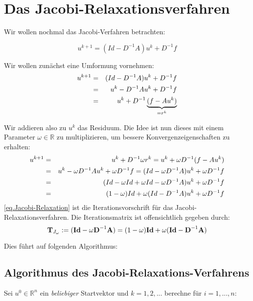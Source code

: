 \section{Das Jacobi-Relaxationsverfahren}\label{s.Jacobi Relaxation}

Wir wollen nochmal das Jacobi-Verfahren betrachten:

\begin{equation}
u^{k+1} = (Id - D^{-1}A)u^{k} + D^{-1}f
\end{equation}

Wir wollen zunächst eine Umformung vornehmen:
\begin{eqnarray}
u^{k+1} &=& (Id - D^{-1}A)u^{k} + D^{-1}f \notag \\
&=& u^{k} - D^{-1}Au^{k} + D^{-1}f \notag \\
&=& u^{k} + D^{-1} \underbrace{(f - Au^{k})}_{= r^{k}}
\end{eqnarray}

Wir addieren also zu $u^{k}$ das Residuum. Die Idee ist nun dieses mit einem Parameter $\omega \in \mathbb{R}$ zu multiplizieren, um bessere Konvergenzeigenschaften zu erhalten:
\begin{eqnarray}
u^{k+1} &=& u^{k} + D^{-1} \omega r^{k} = u^{k} + \omega D^{-1} (f - Au^{k}) \notag \\
&=& u^{k} - \omega D^{-1} Au^{k} + \omega D^{-1}f = (Id - \omega D^{-1} A)u^{k} + \omega D^{-1}f \notag \\
&=& (Id - \omega Id + \omega Id - \omega D^{-1} A)u^{k} + \omega D^{-1}f \notag \\
&=& (1 - \omega)Id + \omega(Id - D^{-1}A) u^{k} + \omega D^{-1}f\label{eq.Jacobi-Relaxation}
\end{eqnarray}
\autoref{eq.Jacobi-Relaxation} ist die Iterationsvorschrift für das Jacobi-Relaxationsverfahren. Die Iterationsmatrix ist offensichtlich gegeben durch:
\begin{equation}
{\textbf{T}}_{J_{\omega}} := ({\textbf{Id}} - \omega {\textbf{D}}^{-1} {\textbf{A}}) = (1 - \omega) {\textbf{Id}} + \omega({\textbf{Id}} - {\textbf{D}}^{-1} {\textbf{A}})
\end{equation}

Dies führt auf folgenden Algorithmus:

\subsection{Algorithmus des Jacobi-Relaxations-Verfahrens}\label{ss.Algorithmus Jacobi Relax}

Sei $u^{0} \in \mathbb{R}^{n}$ ein \textit{beliebiger} Startvektor und $k=1,2,...$ berechne für $i=1,...,n$:

